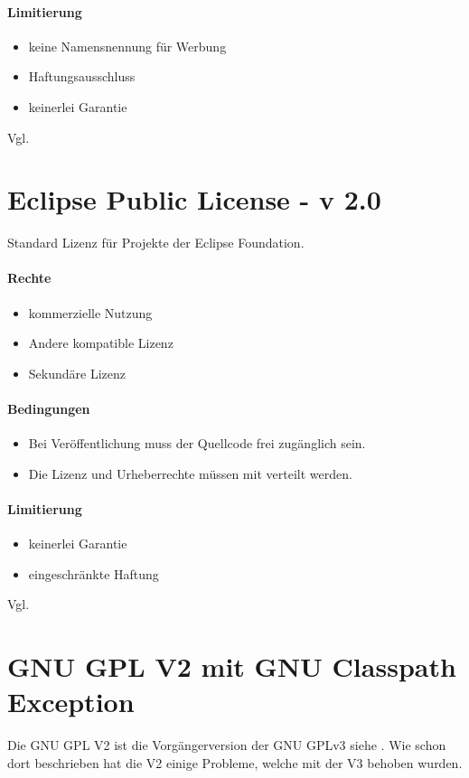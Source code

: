 \paragraph{Limitierung}
\begin{itemize}
    \item keine Namensnennung für Werbung
    \item Haftungsausschluss
    \item keinerlei Garantie
\end{itemize}

Vgl. \cite{bsd-3-clause}

\section{Eclipse Public License - v 2.0}\label{sec:eclipse-public-license---v-2.0}
Standard Lizenz für Projekte der Eclipse Foundation.

\paragraph{Rechte}
\begin{itemize}
    \item kommerzielle Nutzung
    \item Andere kompatible Lizenz
    \item Sekundäre Lizenz
\end{itemize}
\paragraph{Bedingungen}
\begin{itemize}
    \item Bei Veröffentlichung muss der Quellcode frei zugänglich sein.
    \item Die Lizenz und Urheberrechte müssen mit verteilt werden.
\end{itemize}

\paragraph{Limitierung}
\begin{itemize}
    \item keinerlei Garantie
    \item eingeschränkte Haftung
\end{itemize}

Vgl. \cite{epl-2}

\section{GNU GPL V2 mit GNU Classpath Exception}\label{sec:gnu-gpl-v2-mit-gnu-classpath-exception}
Die GNU GPL V2 ist die Vorgängerversion der GNU GPLv3 siehe .
Wie schon dort beschrieben hat die V2 einige Probleme, welche mit der V3 behoben wurden.

